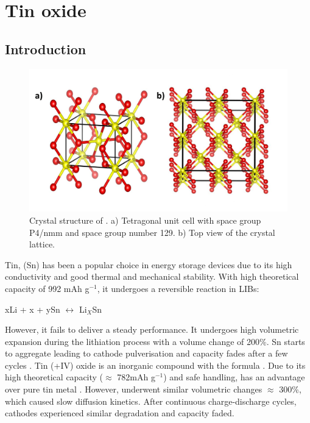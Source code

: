 \section{Tin oxide}

\subsection{Introduction}

\begin{figure}[th!]
  \centering
  \includegraphics[width=\textwidth]{Figures/chap6fig/SnO2crys}
    \caption{Crystal structure of . a) Tetragonal unit cell with space group P4/nmm and space group number 129. b) Top view of the crystal lattice.}
  \label{Figures/chap6fig:SnO2crys}
  \end{figure}
  
Tin, (Sn) has been a popular choice in energy storage devices due to its high conductivity and good thermal and mechanical stability. With high theoretical capacity of 992 mAh g$^{-1}$, it undergoes a reversible reaction in LIBs:

\begin{center}
    xLi + x + ySn $\longleftrightarrow$ Li$_X$Sn  \cite{park_effect_2008}
\end{center}

However, it fails to deliver a steady performance. It undergoes high volumetric expansion during the lithiation process with a volume change of 200\%. Sn starts to aggregate leading to cathode pulverisation and capacity fades after a few cycles \cite{park_effect_2008, zhao_tin-based_2016}.  
Tin (+IV) oxide is an inorganic compound with the formula . Due to its high theoretical capacity ($\approx$ 782mAh g$^{-1}$) and safe handling,  has an advantage over pure tin metal \cite{idota_tin-based_1997}. However,  underwent similar volumetric changes $\approx$ 300{\%}, which caused slow diffusion kinetics. After continuous charge-discharge cycles, cathodes experienced similar degradation and capacity faded.

